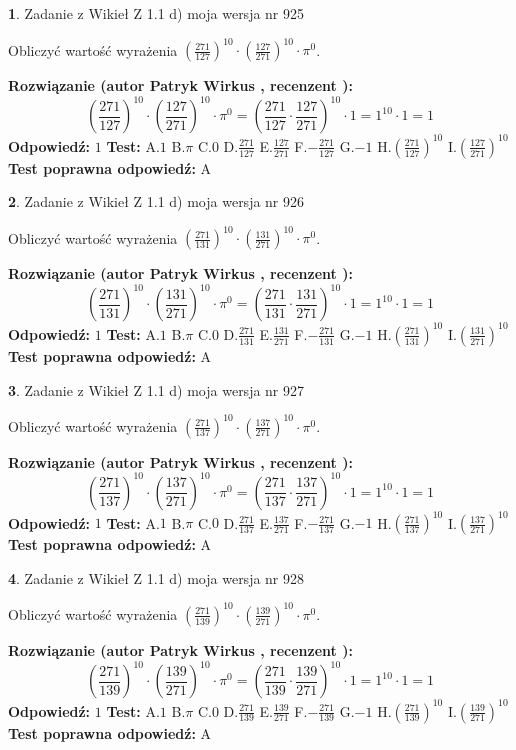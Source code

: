 \documentclass[12pt, a4paper]{article}
\theoremstyle{definition} %
\newtheorem{zad}{}
\newcommand{\zadStart}[1]{\begin{zad}#1\newline}
\newcommand{\zadStop}{\end{zad}}
\newcommand{\rozwStart}[2]{\noindent \textbf{Rozwiązanie (autor #1 , recenzent #2): }\newline}
\newcommand{\rozwStop}{\newline}
\newcommand{\odpStart}{\noindent \textbf{Odpowiedź:}\newline}
\newcommand{\odpStop}{\newline}
\newcommand{\testStart}{\noindent \textbf{Test:}\newline}
\newcommand{\testStop}{\newline}
\newcommand{\kluczStart}{\noindent \textbf{Test poprawna odpowiedź:}\newline}
\newcommand{\kluczStop}{\newline}
\begin{document}
\zadStart{Zadanie z Wikieł Z 1.1 d) moja wersja nr 925}

Obliczyć wartość wyrażenia $(\frac{271}{127})^{10} \cdot (\frac{127}{271})^{10} \cdot \pi^{0}$.
\zadStop
\rozwStart{Patryk Wirkus}{}
$$(\frac{271}{127})^{10} \cdot (\frac{127}{271})^{10} \cdot \pi^{0} = (\frac{271}{127} \cdot \frac{127}{271})^{10} \cdot 1 = 1^{10} \cdot 1 = 1$$
\rozwStop
\odpStart
$1$
\odpStop
\testStart
A.$1$ B.$\pi$ C.$0$ D.$\frac{271}{127}$ E.$\frac{127}{271}$
F.$-\frac{271}{127}$ G.$-1$
H.$(\frac{271}{127})^{10}$
I.$(\frac{127}{271})^{10}$
\testStop
\kluczStart
A
\kluczStop



\zadStart{Zadanie z Wikieł Z 1.1 d) moja wersja nr 926}

Obliczyć wartość wyrażenia $(\frac{271}{131})^{10} \cdot (\frac{131}{271})^{10} \cdot \pi^{0}$.
\zadStop
\rozwStart{Patryk Wirkus}{}
$$(\frac{271}{131})^{10} \cdot (\frac{131}{271})^{10} \cdot \pi^{0} = (\frac{271}{131} \cdot \frac{131}{271})^{10} \cdot 1 = 1^{10} \cdot 1 = 1$$
\rozwStop
\odpStart
$1$
\odpStop
\testStart
A.$1$ B.$\pi$ C.$0$ D.$\frac{271}{131}$ E.$\frac{131}{271}$
F.$-\frac{271}{131}$ G.$-1$
H.$(\frac{271}{131})^{10}$
I.$(\frac{131}{271})^{10}$
\testStop
\kluczStart
A
\kluczStop



\zadStart{Zadanie z Wikieł Z 1.1 d) moja wersja nr 927}

Obliczyć wartość wyrażenia $(\frac{271}{137})^{10} \cdot (\frac{137}{271})^{10} \cdot \pi^{0}$.
\zadStop
\rozwStart{Patryk Wirkus}{}
$$(\frac{271}{137})^{10} \cdot (\frac{137}{271})^{10} \cdot \pi^{0} = (\frac{271}{137} \cdot \frac{137}{271})^{10} \cdot 1 = 1^{10} \cdot 1 = 1$$
\rozwStop
\odpStart
$1$
\odpStop
\testStart
A.$1$ B.$\pi$ C.$0$ D.$\frac{271}{137}$ E.$\frac{137}{271}$
F.$-\frac{271}{137}$ G.$-1$
H.$(\frac{271}{137})^{10}$
I.$(\frac{137}{271})^{10}$
\testStop
\kluczStart
A
\kluczStop



\zadStart{Zadanie z Wikieł Z 1.1 d) moja wersja nr 928}

Obliczyć wartość wyrażenia $(\frac{271}{139})^{10} \cdot (\frac{139}{271})^{10} \cdot \pi^{0}$.
\zadStop
\rozwStart{Patryk Wirkus}{}
$$(\frac{271}{139})^{10} \cdot (\frac{139}{271})^{10} \cdot \pi^{0} = (\frac{271}{139} \cdot \frac{139}{271})^{10} \cdot 1 = 1^{10} \cdot 1 = 1$$
\rozwStop
\odpStart
$1$
\odpStop
\testStart
A.$1$ B.$\pi$ C.$0$ D.$\frac{271}{139}$ E.$\frac{139}{271}$
F.$-\frac{271}{139}$ G.$-1$
H.$(\frac{271}{139})^{10}$
I.$(\frac{139}{271})^{10}$
\testStop
\kluczStart
A
\kluczStop
\end{document}
